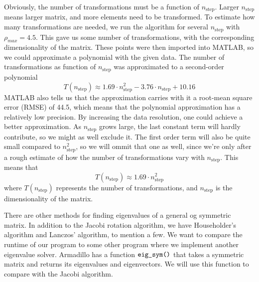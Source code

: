 Obviously, the number of transformations must be a function of $n_{\mathrm{step}}$. Larger
$n_{\mathrm{step}}$ means larger matrix, and more elements need to be transformed.
To estimate how many transformations are needed, we run the algorithm for several
$n_{\mathrm{step}}$ with $\rho_{max} = 4.5$. This gave us some number of transformations,
with the corresponding dimensionality of the matrix. These points were then imported into 
MATLAB, so we could approximate a polynomial with the given data. The number of transformations as function of $n_{\mathrm{step}}$ was approximated to a second-order polynomial
%
$$ T(n_{\mathrm{step}}) \approx 1.69 \cdot n_{\mathrm{step}}^2 - 3.76 \cdot n_{\mathrm{step}}
+ 10.16 $$
%
MATLAB also tells us that the approximation carries with it a root-mean square error
(RMSE) of 44.5, which means that the polynomial approximation has a relatively low
precision. By increasing the data resolution, one could achieve a better approximation.
As $n_{\mathrm{step}}$ grows large, the last constant term will hardly contribute, so we 
might as well exclude it. The first order term will also be quite small compared to
$n_{\mathrm{step}}^2$, so we will ommit that one as well, since we're only after a rough 
estimate of how the number of transformations vary with $n_{\mathrm{step}}$. This means that
$$ T(n_{\mathrm{step}}) \approx 1.69 \cdot n_{\mathrm{step}}^2 $$
where $T(n_{\mathrm{step}})$ represents the number of transformations, and $n_{\mathrm{step}}$
is the dimensionality of the matrix. 

There are other methods for finding eigenvalues of a general og symmetric matrix. In
addition to the Jacobi rotation algorithm, we have Householder's algorithm and Lanczos'
algorithm, to mention a few. We want to compare the runtime of our program to some
other program where we implement another eigenvalue solver. Armadillo has a function 
$\verb|eig_sym()|$ that takes a symmetric
matrix and returns its eigenvalues and eigenvectors. We will use this function to compare
with the Jacobi algorithm. 

